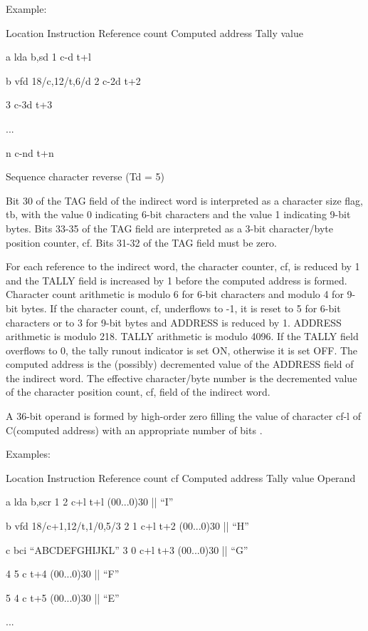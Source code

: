 Example:

Location Instruction Reference count Computed address Tally value

a lda b,sd 1 c-d t+l

b vfd 18/c,12/t,6/d 2 c-2d t+2

3 c-3d t+3

...

n c-nd t+n

Sequence character reverse (Td = 5)

Bit 30 of the TAG field of the indirect word is interpreted as a character size flag, tb, with the value 0 indicating 6-bit characters and the value 1 indicating 9-bit bytes. Bits 33-35 of the TAG field are interpreted as a 3-bit character/byte position counter, cf. Bits 31-32 of the TAG field must be zero.


For each reference to the indirect word, the character counter, cf, is reduced
by 1 and the TALLY field is increased by 1 before the computed address is
formed. Character count arithmetic is modulo 6 for 6-bit characters and modulo
4 for 9-bit bytes. If the character count, cf, underflows to -1, it is reset to
5 for 6-bit characters or to 3 for 9-bit bytes and ADDRESS is reduced by 1.
ADDRESS arithmetic is modulo 218. TALLY arithmetic is modulo 4096. If the TALLY
field overflows to 0, the tally runout indicator is set ON, otherwise it is set
OFF. The computed address is the (possibly) decremented value of the ADDRESS
field of the indirect word.  The effective character/byte number is the
decremented value of the character position count, cf, field of the indirect
word.  

A 36-bit operand is formed by high-order zero filling the value of character
cf-l of C(computed address) with an appropriate number of bits .


Examples:





Location Instruction Reference count cf Computed address Tally value Operand

a lda b,scr 1 2 c+l t+l (00...0)30 || {``}I''

b vfd 18/c+1,12/t,1/0,5/3 2 1 c+l t+2 (00...0)30 || {``}H''

c bci {``}ABCDEFGHIJKL'' 3 0 c+l t+3 (00...0)30 || {``}G''

4 5 c t+4 (00...0)30 || {``}F''

5 4 c t+5 (00...0)30 || {``}E''

...

